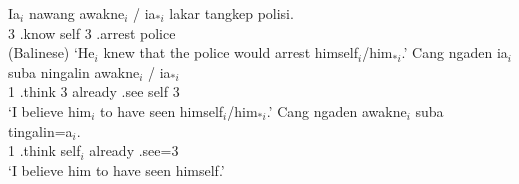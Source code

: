 \documentclass[output=paper,biblatex,babelshorthands,newtxmath,draftmode,colorlinks,citecolor=brown]{langscibook}
\begin{document}
\eal
\label{bal}
%
\ex\label{bal-a}
\gll Ia$_{i}$ nawang       awakne$_{i}$ / ia$_{*i}$  lakar    tangkep        polisi. \\
     3        .know self        {} 3                    .arrest police  \\\hfill(Balinese)
\glt `He$_{i}$ knew that the police would arrest himself$_{i}$/him$_{*i}$.'
\ex\label{bal-b}
\gll Cang      ngaden        ia$_{i}$ suba     ningalin   awakne$_{i}$ / ia$_{*i}$ \\
     1 .think 3        already .see self        {} 3 \\
\glt `I believe him$_{i}$ to have seen himself$_{i}$/him$_{*i}$.'
\ex\label{bal-c}
\gll Cang ngaden        awakne$_{i}$ suba    tingalin=a$_{i}$.\\
     1    .think self$_{i}$   already .see=3 \\
\glt `I believe him to have seen himself.'
\zl
\end{document}
